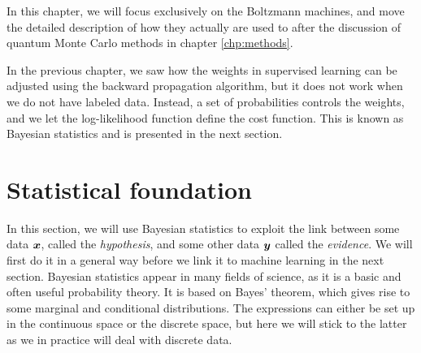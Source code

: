 In this chapter, we will focus exclusively on the Boltzmann machines, and move the detailed description of how they actually are used to after the discussion of quantum Monte Carlo methods in chapter \ref{chp:methods}.

In the previous chapter, we saw how the weights in supervised learning can be adjusted using the backward propagation algorithm, but it does not work when we do not have labeled data. Instead, a set of probabilities controls the weights, and we let the log-likelihood function define the cost function. This is known as Bayesian statistics and is presented in the next section.

\section{Statistical foundation} \label{sec:bayes}
In this section, we will use Bayesian statistics to exploit the link between some data $\boldsymbol{{x}}$, called the \textit{hypothesis}, and some other data $\boldsymbol{{y}}$ called the \textit{evidence}.  We will first do it in a general way before we link it to machine learning in the next section. Bayesian statistics appear in many fields of science, as it is a basic and often useful probability theory. It is based on Bayes' theorem, which gives rise to some marginal and conditional distributions. The expressions can either be set up in the continuous space or the discrete space, but here we will stick to the latter as we in practice will deal with discrete data. 

